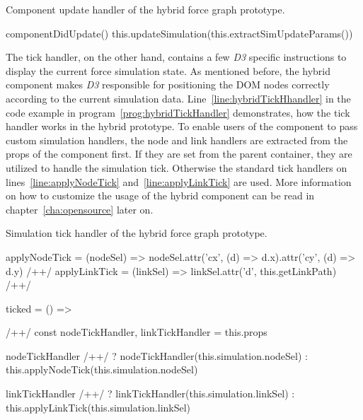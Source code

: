 \begin{program}
\caption{Component update handler of the hybrid force graph prototype.}
\label{prog:hybridUpdateHandler}
\begin{JsCode}
componentDidUpdate() {
  this.updateSimulation(this.extractSimUpdateParams())
}
\end{JsCode}
\end{program}

The tick handler, on the other hand, contains a few \emph{D3} specific instructions to display the current force simulation state. As mentioned before, the hybrid component makes \emph{D3} responsible for positioning the DOM nodes correctly according to the current simulation data. Line~\ref{line:hybridTickHhandler} in the code example in program~\ref{prog:hybridTickHandler} demonstrates, how the tick handler works in the hybrid prototype. To enable users of the component to pass custom simulation handlers, the node and link handlers are extracted from the props of the component first. If they are set from the parent container, they are utilized to handle the simulation tick. Otherwise the standard tick handlers on lines~\ref{line:applyNodeTick} and~\ref{line:applyLinkTick} are used. More information on how to customize the usage of the hybrid component can be read in chapter~\ref{cha:opensource} later on.

\begin{program}
\caption{Simulation tick handler of the hybrid force graph prototype.}
\label{prog:hybridTickHandler}
\begin{JsCode}
applyNodeTick = (nodeSel) => nodeSel.attr('cx', (d) => d.x).attr('cy', (d) => d.y) /+\label{line:applyNodeTick}+/
applyLinkTick = (linkSel) => linkSel.attr('d', this.getLinkPath) /+\label{line:applyLinkTick}+/

ticked = () => { /+\label{line:hybridTickHhandler}+/
  const { nodeTickHandler, linkTickHandler } = this.props

  nodeTickHandler /+\label{line:decideNodeTickHandler}+/
    ? nodeTickHandler(this.simulation.nodeSel)
    : this.applyNodeTick(this.simulation.nodeSel)

  linkTickHandler /+\label{line:decideLinkTickHandler}+/
    ? linkTickHandler(this.simulation.linkSel)
    : this.applyLinkTick(this.simulation.linkSel)
}
\end{JsCode}
\end{program}

